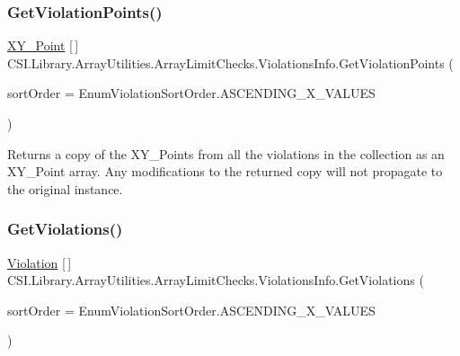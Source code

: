 \subsubsection{\texorpdfstring{GetViolationPoints()}{GetViolationPoints()}}
{\footnotesize\ttfamily \mbox{\hyperlink{struct_c_s_i_1_1_library_1_1_data_types_1_1_x_y___point}{X\+Y\+\_\+\+Point}} \mbox{[}$\,$\mbox{]} C\+S\+I.\+Library.\+Array\+Utilities.\+Array\+Limit\+Checks.\+Violations\+Info.\+Get\+Violation\+Points (\begin{DoxyParamCaption}\item[{Enum\+Violation\+Sort\+Order}]{sort\+Order = {\ttfamily EnumViolationSortOrder.ASCENDING\+\_\+X\+\_\+VALUES} }\end{DoxyParamCaption})\hspace{0.3cm}{\ttfamily [inline]}}



Returns a copy of the X\+Y\+\_\+\+Points from all the violations in the collection as an X\+Y\+\_\+\+Point array. Any modifications to the returned copy will not propagate to the original instance. 

\mbox{\label{struct_c_s_i_1_1_library_1_1_array_utilities_1_1_array_limit_checks_1_1_violations_info_ad40e751c544e2881c9670d21b29ce011}} 
\subsubsection{\texorpdfstring{GetViolations()}{GetViolations()}}
{\footnotesize\ttfamily \mbox{\hyperlink{class_c_s_i_1_1_library_1_1_array_utilities_1_1_array_limit_checks_1_1_violation}{Violation}} \mbox{[}$\,$\mbox{]} C\+S\+I.\+Library.\+Array\+Utilities.\+Array\+Limit\+Checks.\+Violations\+Info.\+Get\+Violations (\begin{DoxyParamCaption}\item[{Enum\+Violation\+Sort\+Order}]{sort\+Order = {\ttfamily EnumViolationSortOrder.ASCENDING\+\_\+X\+\_\+VALUES} }\end{DoxyParamCaption})\hspace{0.3cm}{\ttfamily [inline]}}



